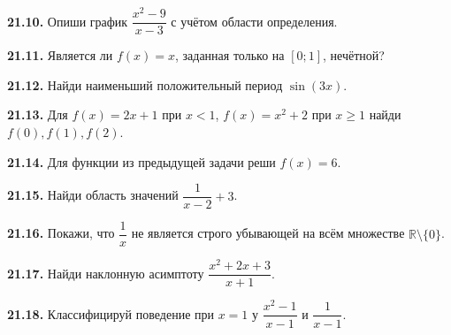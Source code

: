 \noindent\begin{minipage}[t]{\linewidth}\textbf{21.10.} Опиши график \(\dfrac{x^2-9}{x-3}\) с учётом области определения.\par\end{minipage}\par
\noindent\begin{minipage}[t]{\linewidth}\textbf{21.11.} Является ли \(f(x)=x\), заданная только на \([0;1]\), нечётной?\par\end{minipage}\par
\noindent\begin{minipage}[t]{\linewidth}\textbf{21.12.} Найди наименьший положительный период \(\sin(3x)\).\par\end{minipage}\par
\noindent\begin{minipage}[t]{\linewidth}\textbf{21.13.} Для \(f(x)=2x+1\) при \(x<1\), \(f(x)=x^2+2\) при \(x\ge1\) найди \(f(0),f(1),f(2)\).\par\end{minipage}\par
\noindent\begin{minipage}[t]{\linewidth}\textbf{21.14.} Для функции из предыдущей задачи реши \(f(x)=6\).\par\end{minipage}\par
\noindent\begin{minipage}[t]{\linewidth}\textbf{21.15.} Найди область значений \(\dfrac1{x-2}+3\).\par\end{minipage}\par
\noindent\begin{minipage}[t]{\linewidth}\textbf{21.16.} Покажи, что \(\dfrac{1}{x}\) не является строго убывающей на всём множестве \(\mathbb R\setminus\{0\}\).\par\end{minipage}\par
\noindent\begin{minipage}[t]{\linewidth}\textbf{21.17.} Найди наклонную асимптоту \(\dfrac{x^2+2x+3}{x+1}\).\par\end{minipage}\par
\noindent\begin{minipage}[t]{\linewidth}\textbf{21.18.} Классифицируй поведение при \(x=1\) у \(\dfrac{x^2-1}{x-1}\) и \(\dfrac1{x-1}\).\par\end{minipage}\par

